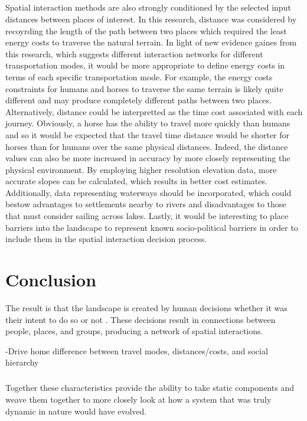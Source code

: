 \documentclass[12pt,a4paper]{thesis}
\begin{document}
\paragraph{}
Spatial interaction methods are also strongly conditioned by the selected input distances between places of interest. In this research, distance was considered by recoyrding the length of the path between two places which required the least energy costs to traverse the natural terrain. In light of new evidence gaines from this research, which suggests different interaction networks for different transportation modes, it would be more appropriate to define energy costs in terms of each specific transportation mode. For example, the energy costs constraints for humans and horses to traverse the same terrain is likely quite different and may produce completely different paths between two places. Alternatively, distance could be interpretted as the time cost associated with each journey. Obviously, a horse has the ability to travel more quickly than humans and so it would be expected that the travel time distance would be shorter for horses than for humans over the same physical distances. Indeed, the distance values can also be more increased in accuracy by more closely representing the physical environment. By employing higher resolution elevation data, more accurate slopes can be calculated, which results in better cost estimates. Additionally, data representing waterways should be incorporated, which could bestow advantages to settlements nearby to rivers and disadvantages to those that must consider sailing across lakes. Lastly, it would be interesting to place barriers into the landscape to represent known socio-political barriers in order to include them in the spatial interaction decision process.  



\chapter{Conclusion}

The result is that the landscape is created by human decisions whether it was their intent to do so or not \citetext{\citealp[3-8]{Eckbo69}; \citealp[161]{AnsWilSch01}}. These decisions result in connections between people, places, and groups, producing a network of spatial interactions. 

-Drive home difference between travel modes, distances/costs, and social hierarchy

\paragraph{}
Together these characteristics provide the ability to take static components and weave them together to more closely look at how a system that was truly dynamic in nature would have evolved.
\end{document}
